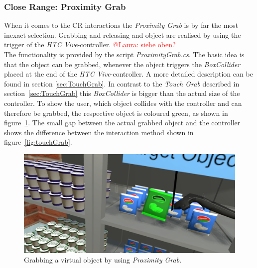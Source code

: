 \subsubsection{Close Range: Proximity Grab} \label{sec:ProximityGrab}
When it comes to the CR interactions the \textit{Proximity Grab} is by far the most inexact selection. Grabbing and releasing and object are realised by using the trigger of the \textit{HTC Vive}-controller. \textcolor{red}{@Laura: siehe oben?}  \\
The functionality is provided by the script \textit{ProximityGrab.cs}. The basic idea is that the object can be grabbed, whenever the object triggers the \textit{BoxCollider} \cite{website:BoxCollider} placed at the end of the \textit{HTC Vive}-controller. A more detailed description can be found in section \ref{sec:TouchGrab}. In contrast to the \textit{Touch Grab} described in section~\ref{sec:TouchGrab} this \textit{BoxCollider} is bigger than the actual size of the controller. To show the user, which object collides with the controller and can therefore be grabbed, the respective object is coloured green, as shown in figure~\ref{fig:proximityGrab}. The small gap between the actual grabbed object and the controller shows the difference between the interaction method shown in figure~\ref{fig:touchGrab}.

\begin{figure}[H] 
	\center 
	\includegraphics[width=12cm]{Images/ProximityGrab.PNG}			
	\caption[Grabbing a virtual object by using \textit{Proximity Grab}.]{Grabbing a virtual object by using \textit{Proximity Grab}.}
	\label{fig:proximityGrab}
\end{figure}


